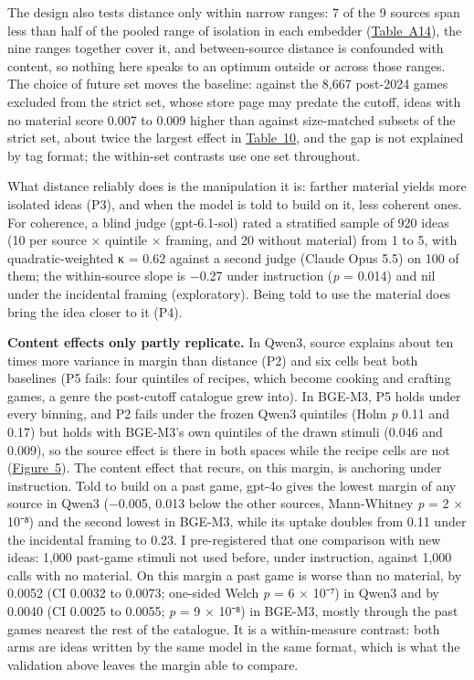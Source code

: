 \documentclass[
  10pt,
]{article}
\begin{document}
The design also tests distance only
within narrow ranges: 7 of the 9 sources
span less than half of the pooled range
of isolation in each embedder
(\hyperref[tab:A14]{Table~A14}), the
nine ranges together cover it, and
between-source distance is confounded
with content, so nothing here speaks to
an optimum outside or across those
ranges. The choice of future set moves
the baseline: against the 8,667
post-2024 games excluded from the strict
set, whose store page may predate the
cutoff, ideas with no material score
0.007 to 0.009 higher than against
size-matched subsets of the strict set,
about twice the largest effect in
\hyperref[tab:10]{Table~10}, and the gap
is not explained by tag format; the
within-set contrasts use one set
throughout.

What distance reliably does is the
manipulation it is: farther material
yields more isolated ideas (P3), and
when the model is told to build on it,
less coherent ones. For coherence, a
blind judge (gpt-6.1-sol) rated a
stratified sample of 920 ideas (10 per
source × quintile × framing, and 20
without material) from 1 to 5, with
quadratic-weighted κ = 0.62 against a
second judge (Claude Opus 5.5) on 100 of
them; the within-source slope is −0.27
under instruction (\emph{p} = 0.014) and
nil under the incidental framing
(exploratory). Being told to use the
material does bring the idea closer to
it (P4).

\textbf{Content effects only partly
replicate.} In Qwen3, source explains
about ten times more variance in margin
than distance (P2) and six cells beat
both baselines (P5 fails: four quintiles
of recipes, which become cooking and
crafting games, a genre the post-cutoff
catalogue grew into). In BGE-M3, P5
holds under every binning, and P2 fails
under the frozen Qwen3 quintiles (Holm
\emph{p} 0.11 and 0.17) but holds with
BGE-M3's own quintiles of the drawn
stimuli (0.046 and 0.009), so the source
effect is there in both spaces while the
recipe cells are not
(\hyperref[fig:5]{Figure~5}). The
content effect that recurs, on this
margin, is anchoring under instruction.
Told to build on a past game, gpt-4o
gives the lowest margin of any source in
Qwen3 (−0.005, 0.013 below the other
sources, Mann-Whitney \emph{p} = 2 ×
10⁻⁸) and the second lowest in BGE-M3,
while its uptake doubles from 0.11 under
the incidental framing to 0.23. I
pre-registered that one comparison with
new ideas: 1,000 past-game stimuli not
used before, under instruction, against
1,000 calls with no material. On this
margin a past game is worse than no
material, by 0.0052 (CI 0.0032 to
0.0073; one-sided Welch \emph{p} = 6 ×
10⁻⁷) in Qwen3 and by 0.0040 (CI 0.0025
to 0.0055; \emph{p} = 9 × 10⁻⁸) in
BGE-M3, mostly through the past games
nearest the rest of the catalogue. It is
a within-measure contrast: both arms are
ideas written by the same model in the
same format, which is what the
validation above leaves the margin able
to compare.
\end{document}
